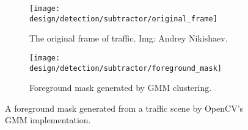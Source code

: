 \begin{figure*}[htbp]
    \centering 
    \begin{subfigure}[b]{0.45\textwidth}
        \texttt{[image: design/detection/subtractor/original\_frame]}
        \captionsetup{format = hang}
        \caption{The original frame of traffic. Img: Andrey Nikishaev.}
        \label{fig:original_frame}
    \end{subfigure}
    \begin{subfigure}[b]{0.45\textwidth}
        \texttt{[image: design/detection/subtractor/foreground\_mask]}
        \captionsetup{format = hang}
        \caption{Foreground mask generated by GMM clustering.}
        \label{fig:foreground_mask_unfiltered}
    \end{subfigure}
    \captionsetup{format=hang}
    \caption{A foreground mask generated from a traffic scene by OpenCV's GMM implementation.}
    \label{fig:example_subtraction}
\end{figure*}